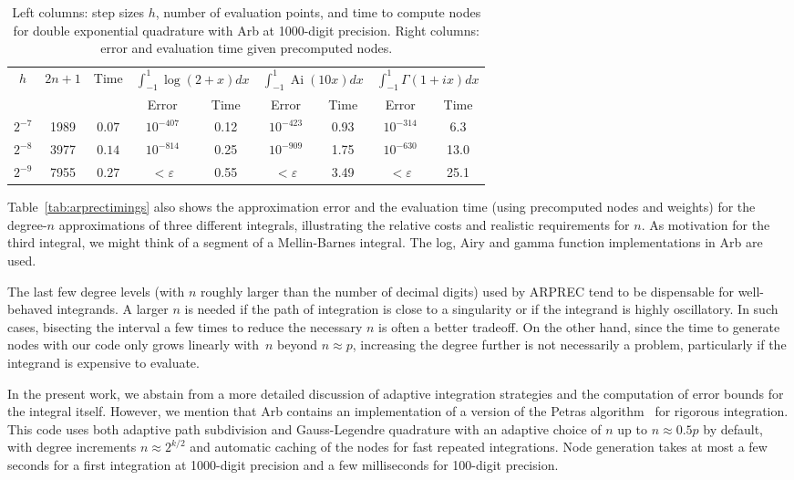 \documentclass{siamart0216}
\begin{document}
\begin{table}[h!]
\caption{Left columns: step sizes $h$, number of evaluation
points, and time to compute nodes for double exponential quadrature with Arb
at 1000-digit precision. Right columns: error and evaluation
time given precomputed nodes.}
\begin{center}
\begin{tabular}{ c c c | c c | c c | c c }
$h$ & $2n+1$ & Time &
    \multicolumn{2}{|c|}{$\int_{-1}^{1}\!\log(2\!+\!x) dx$} &
    \multicolumn{2}{|c|}{$\int_{-1}^{1}\!\operatorname{Ai}(10 x) dx$} &
    \multicolumn{2}{|c}{$\int_{-1}^{1}\!\Gamma(1\!+\!ix) dx$} \\ 
   &         &          & Error   & Time      &  Error & Time  &  Error & Time \\ \hline
\rule{0pt}{3ex}$2^{-7}$ & 1989 & $0.07$ & $10^{-407}$ & 0.12 & $10^{-423}$ & 0.93 & $10^{-314}$ & 6.3 \\
$2^{-8}$ & 3977 & $0.14$ & $10^{-814}$ & 0.25 & $10^{-909}$ & 1.75 & $10^{-630}$ & 13.0 \\
$2^{-9}$ & 7955 & $0.27$ & $<\varepsilon$ & 0.55 & $<\varepsilon$ & 3.49 & $<\varepsilon$ & 25.1
\end{tabular}
\label{tab:dequad}
\end{center}
\end{table}

Table~\ref{tab:arprectimings} also
shows the approximation error
and the evaluation time (using precomputed nodes and weights)
for the degree-$n$ approximations of three different integrals,
illustrating the relative costs and realistic requirements for $n$.
As motivation for the third integral, we might think
of a segment of a Mellin-Barnes integral.
The log, Airy and gamma function implementations in Arb are used.

The last few degree levels (with $n$ roughly larger than
the number of decimal digits) used by ARPREC
tend to be dispensable for well-behaved integrands.
A larger $n$ is needed if the path of integration
is close to a singularity or if the integrand is highly oscillatory.
In such cases, bisecting the interval a few times
to reduce the necessary $n$ is often a better tradeoff.
On the other hand, since the time to generate nodes with our code only
grows linearly with~$n$ beyond $n \approx p$,
increasing the degree further is not necessarily a problem,
particularly if the integrand is expensive to evaluate.

In the present work, we abstain from a more detailed discussion of
adaptive integration strategies and the computation
of error bounds for the integral itself.
However, we mention that Arb contains an implementation of a
version of the Petras algorithm~\cite{petras2002self} for rigorous
integration. This code uses both adaptive path subdivision
and Gauss-Legendre quadrature with an adaptive choice of $n$ up to
$n \approx 0.5p$ by default, with degree increments
$n \approx 2^{k/2}$ and automatic caching of the nodes
for fast repeated integrations.
Node generation takes at most a few seconds for a first integration
at 1000-digit precision
and a few milliseconds for 100-digit precision.
\end{document}
